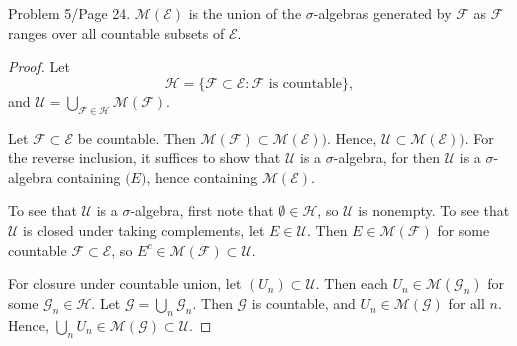 \documentclass{article}
\begin{document}
 Problem 5/Page 24. $\mathcal M( \mathcal E)$ is the union of the $\sigma$-algebras generated by $\mathcal F$ as $\mathcal F$ ranges over all countable subsets of $\mathcal E$.
\begin{proof}
Let $$\mathcal H =  \{ \mathcal F \subset \mathcal E : \mathcal F \text{ is countable} \},$$ and $\mathcal U = \bigcup_{\mathcal F \in \mathcal H} \mathcal M ( \mathcal F )$.


Let $\mathcal F \subset \mathcal E$ be countable. Then $\mathcal M (\mathcal F) \subset \mathcal M (\mathcal E))$.   Hence, $\mathcal U \subset \mathcal M ( \mathcal E))$. For the reverse inclusion, it suffices to show that $\mathcal U$ is a $\sigma$-algebra, for then $ \mathcal U$ is a $\sigma$-algebra containing $\mathcal(E)$, hence containing $\mathcal M(\mathcal E)$.  

To see that $\mathcal U$ is a $\sigma$-algebra, first note that $\emptyset \in \mathcal H$, so $\mathcal U$ is nonempty. To see that $\mathcal U$ is closed under taking complements, let $E \in \mathcal U$.  Then $E \in \mathcal M ( \mathcal F )$ for some countable $\mathcal F \subset \mathcal E$, so $E^c \in \mathcal M ( \mathcal F) \subset \mathcal U$.  

For closure under countable union, let $(U_n) \subset \mathcal U$. Then each $U_n \in \mathcal M (\mathcal G_n)$ for some $\mathcal G_n \in \mathcal H$. 
Let $\mathcal G = \bigcup_n \mathcal G_n$.  Then $\mathcal G$ is countable, and $U_n \in \mathcal M (\mathcal G)$ for all $n$. Hence, $\bigcup_n U_n \in \mathcal M (\mathcal G) \subset \mathcal U$.
\end{proof}
\end{document}
